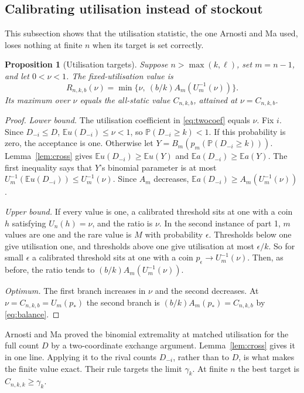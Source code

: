\documentclass[11pt,a4paper]{article}
\newtheorem{prop}[thm]{Proposition}
\theoremstyle{remark}
\newcommand{\E}{\mathbb E}
\newcommand{\Prob}{\mathbb P}
\begin{document}
\subsection{Calibrating utilisation instead of stockout}
This subsection shows that the utilisation statistic, the one Arnosti and Ma used, loses nothing at finite $n$ when its target is set correctly.

\begin{prop}[Utilisation targets]\label{prop:util}
Suppose $n>\max(k,\ell)$, set $m=n-1$, and let $0<\nu<1$. The fixed-utilisation value is
\[
 R_{n,k,b}(\nu)=\min\big\{\nu,\ (b/k)A_m(U_m^{-1}(\nu))\big\}.
\]
Its maximum over $\nu$ equals the all-static value $C_{n,k,b}$, attained at $\nu=C_{n,k,b}$.
\end{prop}
\begin{proof}
\emph{Lower bound.} The utilisation coefficient in \eqref{eq:twocoef} equals $\nu$. Fix $i$. Since $D_{-i}\le D$, $\E u(D_{-i})\le\nu<1$, so $\Prob(D_{-i}\ge k)<1$. If this probability is zero, the acceptance is one. Otherwise let $Y=B_m(p_m(\Prob(D_{-i}\ge k)))$. Lemma~\ref{lem:cross} gives $\E u(D_{-i})\ge\E u(Y)$ and $\E a(D_{-i})\ge\E a(Y)$. The first inequality says that $Y$'s binomial parameter is at most $U_m^{-1}(\E u(D_{-i}))\le U_m^{-1}(\nu)$. Since $A_m$ decreases, $\E a(D_{-i})\ge A_m(U_m^{-1}(\nu))$.

\emph{Upper bound.} If every value is one, a calibrated threshold sits at one with a coin $h$ satisfying $U_n(h)=\nu$, and the ratio is $\nu$. In the second instance of part 1, $m$ values are one and the rare value is $M$ with probability $\epsilon$. Thresholds below one give utilisation one, and thresholds above one give utilisation at most $\epsilon/k$. So for small $\epsilon$ a calibrated threshold sits at one with a coin $p_\epsilon\to U_m^{-1}(\nu)$. Then, as before, the ratio tends to $(b/k)A_m(U_m^{-1}(\nu))$.

\emph{Optimum.} The first branch increases in $\nu$ and the second decreases. At $\nu=C_{n,k,b}=U_m(p_*)$ the second branch is $(b/k)A_m(p_*)=C_{n,k,b}$ by \eqref{eq:balance}.
\end{proof}
Arnosti and Ma \cite[Lemma~2]{am} proved the binomial extremality at matched utilisation for the full count $D$ by a two-coordinate exchange argument. Lemma~\ref{lem:cross} gives it in one line. Applying it to the rival counts $D_{-i}$, rather than to $D$, is what makes the finite value exact. Their rule targets the limit $\gamma_k$. At finite $n$ the best target is $C_{n,k,k}\ge\gamma_k$.
\end{document}
